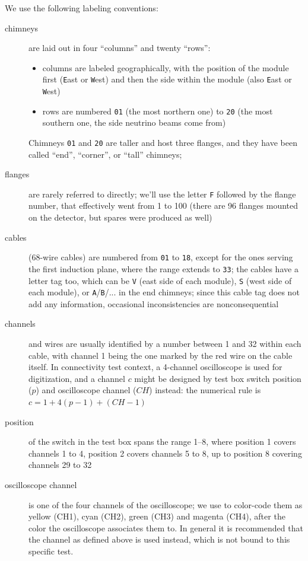 We use the following labeling conventions:
\begin{description}
  \item[chimneys] are laid out in four ``columns'' and twenty ``rows'':
    \begin{itemize}
      \item columns are labeled geographically, with the position of the module
            first (\texttt{E}ast or \texttt{W}est) and then the side within the
            module (also \texttt{E}ast or \texttt{W}est)
      \item rows are numbered \texttt{01} (the most northern one) to \texttt{20}
            (the most southern one, the side neutrino beams come from)
    \end{itemize}
    Chimneys \texttt{01} and \texttt{20} are taller and host three flanges,
    and they have been called ``end'', ``corner'', or ``tall'' chimneys;
  \item[flanges] are rarely referred to directly; we'll use the letter
    \texttt{F} followed by the flange number, that effectively went from 1 to
    100 (there are 96 flanges mounted on the detector, but spares were produced
    as well)
  \item[cables] (68-wire cables) are numbered from \texttt{01} to \texttt{18},
    except for the ones serving the first induction plane, where the range
    extends to \texttt{33}; the cables have a letter tag too, which can be
    \texttt{V} (east side of each module), \texttt{S} (west side of each
    module), or \texttt{A}/\texttt{B}/... in the end chimneys; since this cable
    tag does not add any information, occasional inconsistencies are
    nonconsequential
  \item[channels] and wires are usually identified by a number between 1 and 32
    within each cable, with channel 1 being the one marked by the red wire on
    the cable itself. In connectivity test context, a 4-channel oscilloscope
    is used for digitization, and a channel $c$ might be designed by test box
    switch position ($p$) and oscilloscope channel ($CH$) instead: the numerical
    rule is $ c = 1 + 4 (p - 1) + (CH - 1) $
  \item[position] of the switch in the test box spans the range 1--8, where
    position 1 covers channels 1 to 4, position 2 covers channels 5 to 8, up to
    position 8 covering channels 29 to 32
  \item[oscilloscope channel] is one of the four channels of the oscilloscope;
    we use to color-code them as yellow (CH1), cyan (CH2), green (CH3) and
    magenta (CH4), after the color the oscilloscope associates them to. In
    general it is recommended that the channel as defined above is used instead,
    which is not bound to this specific test.
\end{description}


